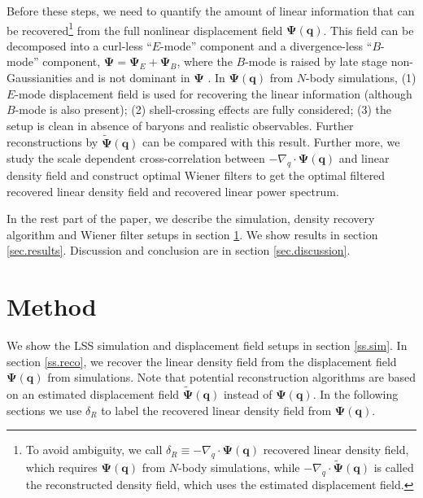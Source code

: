 \documentclass[aps,prd,twocolumn,superscriptaddress,amsfont,amssymb,amsmath,nofootinbib,showpacs,balancelastpage]{revtex4-1}
\newcommand{\bs}{\boldsymbol}
\begin{document}
Before these steps, we need to quantify the amount of linear information
that can be recovered\footnote{To avoid ambiguity, we call
$\delta_R\equiv-\nabla_q\cdot\bs\Psi(\bs q)$ recovered linear density field, which
requires $\bs\Psi(\bs q)$ from $N$-body simulations, while
$-\nabla_q\cdot\tilde{\bs \Psi}(\bs q)$ is called the
reconstructed density field, which uses the estimated displacement field.}
from the full nonlinear displacement field $\bs\Psi(\bs q)$.
This field can be decomposed into a curl-less ``$E$-mode'' component
and a divergence-less ``$B$-mode'' component, $\bs\Psi=\bs\Psi_E+\bs\Psi_B$,
where the $B$-mode is raised by late stage non-Gaussianities and is not
dominant in $\bs\Psi$ \citep{2014PhRvD..89h3515C}.
In $\bs\Psi(\bs q)$ from $N$-body simulations,
(1) $E$-mode displacement field is used for recovering the linear information
(although $B$-mode is also present); (2) shell-crossing effects are fully considered;
(3) the setup is clean in absence of baryons and realistic
observables. Further reconstructions by $\tilde{\bs \Psi}(\bs q)$
can be compared with this result.
Further more, we study the scale dependent cross-correlation
between $-\nabla_q\cdot\bs\Psi(\bs q)$ and linear density field
and construct optimal Wiener filters to get the optimal filtered
recovered linear density field and recovered linear power spectrum.

In the rest part of the paper, we describe the simulation,
density recovery algorithm and Wiener filter setups in section
\ref{sec.method}. We show results in section \ref{sec.results}.
Discussion and conclusion are in section \ref{sec.discussion}.


\section{Method}\label{sec.method}
We show the LSS simulation and displacement field setups in section \ref{ss.sim}.
In section \ref{ss.reco}, we recover the linear density field from the
displacement field $\bs\Psi(\bs q)$ from simulations.
Note that potential reconstruction algorithms are
based on an estimated displacement field $\tilde{\bs \Psi}(\bs q)$
instead of $\bs\Psi(\bs q)$. In the following sections we
use $\delta_R$ to label the recovered linear density field
from $\bs\Psi(\bs q)$.
\end{document}
